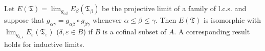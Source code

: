 Let $E(\mathfrak{T}) = \lim_{g_{\alpha \beta}} E_{\beta}(\mathfrak{T}_\beta)$ be the projective limit of a family of l.c.s. and suppose that $g_{\alpha \gamma} = g_{\alpha \beta} \circ g_{\beta \gamma}$ whenever $\alpha \leq \beta \leq \gamma$. Then $E(\mathfrak{T})$ is isomorphic with $\lim_{g_{\delta, \varepsilon}} E_{\varepsilon}(\mathfrak{T}_\varepsilon)$ ($\delta, \varepsilon \in B$) if $B$ is a cofinal subset of $A$. A corresponding result holds for inductive limits.
